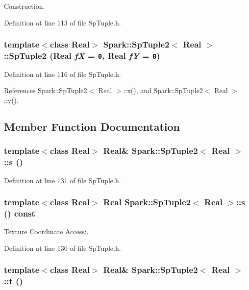 Construction. 

Definition at line 113 of file Sp\-Tuple.h.
\subsubsection{\setlength{\rightskip}{0pt plus 5cm}template$<$class Real$>$ {\bf Spark::Sp\-Tuple2}$<$ Real $>$::{\bf Sp\-Tuple2} (Real {\em f\-X} = {\tt 0}, Real {\em f\-Y} = {\tt 0})\hspace{0.3cm}{\tt  [inline]}}\label{classSpark_1_1SpTuple2_a1}


Definition at line 116 of file Sp\-Tuple.h.

References Spark::Sp\-Tuple2$<$ Real $>$::x(), and Spark::Sp\-Tuple2$<$ Real $>$::y().

\subsection{Member Function Documentation}
\subsubsection{\setlength{\rightskip}{0pt plus 5cm}template$<$class Real$>$ Real\& {\bf Spark::Sp\-Tuple2}$<$ Real $>$::s ()\hspace{0.3cm}{\tt  [inline]}}\label{classSpark_1_1SpTuple2_a7}


Definition at line 131 of file Sp\-Tuple.h.
\subsubsection{\setlength{\rightskip}{0pt plus 5cm}template$<$class Real$>$ Real {\bf Spark::Sp\-Tuple2}$<$ Real $>$::s () const\hspace{0.3cm}{\tt  [inline]}}\label{classSpark_1_1SpTuple2_a6}


Texture Coordinate Access:. 

Definition at line 130 of file Sp\-Tuple.h.
\subsubsection{\setlength{\rightskip}{0pt plus 5cm}template$<$class Real$>$ Real\& {\bf Spark::Sp\-Tuple2}$<$ Real $>$::t ()\hspace{0.3cm}{\tt  [inline]}}\label{classSpark_1_1SpTuple2_a9}


